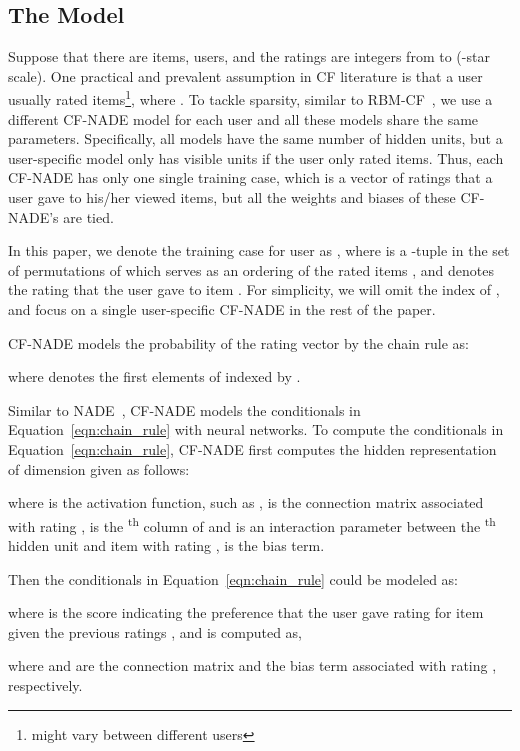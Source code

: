 \documentclass{article}
\newcommand{\cfnade}{CF-NADE\xspace}
\begin{document}
\subsection{The Model} 
\label{sec:model}


Suppose that there are  items,  users, and the ratings are
integers from  to  (-star scale). One practical and prevalent
assumption in CF literature is that a user usually rated 
items\footnote{ might vary between different users}, where
. To tackle sparsity, similar to
RBM-CF~\citep{salakhutdinov2007restricted}, we use a different \cfnade
model for each user and all these models share the same
parameters. Specifically, all models have the same number of hidden
units, but a user-specific model only has  visible units if the user
only rated  items. Thus, each \cfnade has only one single training
case, which is a vector of ratings that a user gave to his/her viewed
items, but all the weights and biases of these \cfnade 's are tied.

In this paper, we denote the training case for user  as
,
where  is a -tuple in the set of permutations of
 which serves as an ordering of the rated items
, and 
denotes the rating that the user gave to item . For
simplicity, we will omit the index  of , and focus on a
single user-specific \cfnade in the rest of the paper.





\cfnade models the probability of the rating vector  by the chain rule as:

where  denotes the first  elements of  indexed by .

Similar to NADE~\citep{larochelle2011neural}, \cfnade models the
conditionals in Equation~\ref{eqn:chain_rule} with neural networks. To
compute the conditionals in Equation~\ref{eqn:chain_rule}, \cfnade
first computes the hidden representation of dimension  given
 as follows:

where  is the activation function, such as ,  is the connection
matrix associated with rating ,  is the \textsuperscript{th} column of   and  is an interaction
parameter between the \textsuperscript{th} hidden unit and item
 with rating ,   is the bias term.

Then the conditionals in Equation~\ref{eqn:chain_rule} could be modeled as:

where  is the score indicating the preference that the user gave rating  for item  given the previous ratings , and  is computed as,

where  and   are the connection matrix and the bias term associated with rating , respectively. 
\end{document}
